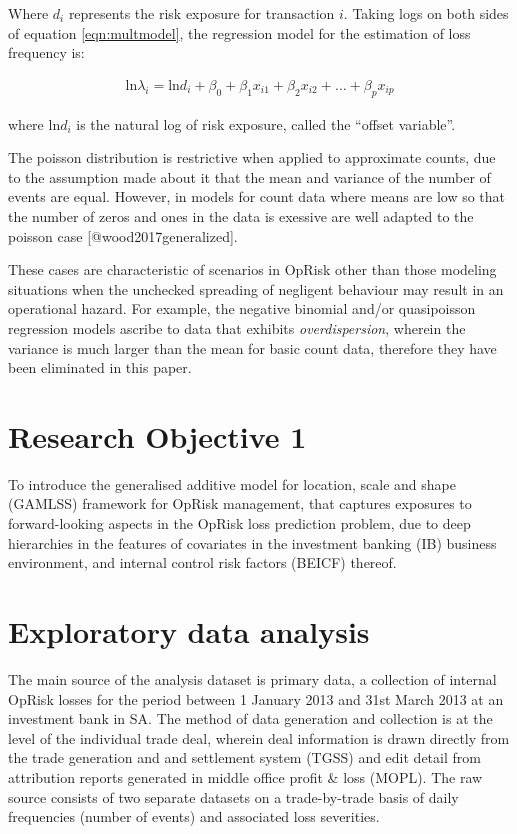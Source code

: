 \documentclass[]{article}
\begin{document}
Where \(d_i\) represents the risk exposure for transaction \(i\). Taking
logs on both sides of equation \ref{eqn:multmodel}, the regression model
for the estimation of loss frequency is:

\singlespacing

\begin{eqnarray}
\mbox{ln}\lambda_i =  \mbox{ln}d_i + \beta_0 + \beta_1x_{i1} + \beta_2x_{i2} + \ldots + \beta_px_{ip}
\end{eqnarray} \doublespacing

where \(\mbox{ln}d_i\) is the natural log of risk exposure, called the
``offset variable''.\medskip

The poisson distribution is restrictive when applied to approximate
counts, due to the assumption made about it that the mean and variance
of the number of events are equal. However, in models for count data
where means are low so that the number of zeros and ones in the data is
exessive are well adapted to the poisson case
{[}@wood2017generalized{]}.\medskip

These cases are characteristic of scenarios in OpRisk other than those
modeling situations when the unchecked spreading of negligent behaviour
may result in an operational hazard. For example, the negative binomial
and/or quasipoisson regression models ascribe to data that exhibits
\emph{overdispersion}, wherein the variance is much larger than the mean
for basic count data, therefore they have been eliminated in this paper.

\section{Research Objective 1}
\label{sec:Research Objective 1}

To introduce the generalised additive model for location, scale and
shape (GAMLSS) framework for OpRisk management, that captures exposures
to forward-looking aspects in the OpRisk loss prediction problem, due to
deep hierarchies in the features of covariates in the investment banking
(IB) business environment, and internal control risk factors (BEICF)
thereof.

\section{Exploratory data analysis}
\label{sec:Exploratory data analysis}

The main source of the analysis dataset is primary data, a collection of
internal OpRisk losses for the period between 1 January 2013 and 31st
March 2013 at an investment bank in SA. The method of data generation
and collection is at the level of the individual trade deal, wherein
deal information is drawn directly from the trade generation and and
settlement system (TGSS) and edit detail from attribution reports
generated in middle office profit \& loss (MOPL). The raw source
consists of two separate datasets on a trade-by-trade basis of daily
frequencies (number of events) and associated loss severities.\medskip
\end{document}
